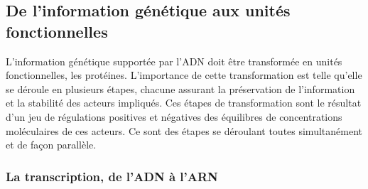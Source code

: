 \subsection{De l'information génétique aux unités fonctionnelles} \label{trans_trad}

L'information génétique supportée par l'ADN doit être transformée en unités fonctionnelles, les protéines. L'importance de cette transformation est telle qu'elle se déroule en plusieurs étapes, chacune assurant la préservation de l'information et la stabilité des acteurs impliqués. Ces étapes de transformation sont le résultat d'un jeu de régulations positives et négatives des équilibres de concentrations moléculaires de ces acteurs. Ce sont des étapes se déroulant toutes simultanément et de façon parallèle.

\subsubsection{La transcription, de l'ADN à l'ARN}





